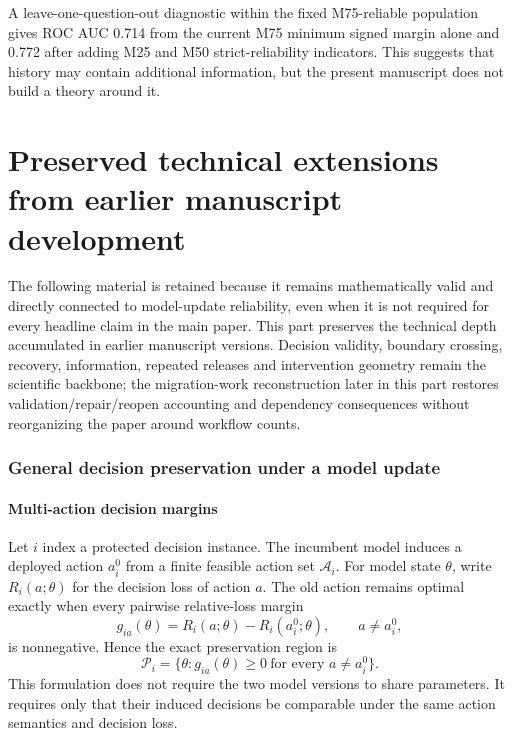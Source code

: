 \documentclass[11pt,letterpaper]{article}
\theoremstyle{plain}
\newcommand{\1}{\mathbf 1}
\begin{document}
A leave-one-question-out diagnostic within the fixed M75-reliable population gives ROC AUC 0.714 from the current M75 minimum signed margin alone and 0.772 after adding M25 and M50 strict-reliability indicators. This suggests that history may contain additional information, but the present manuscript does not build a theory around it.



\part*{Preserved technical extensions from earlier manuscript development}

The following material is retained because it remains mathematically valid and directly connected to model-update reliability, even when it is not required for every headline claim in the main paper. This part preserves the technical depth accumulated in earlier manuscript versions. Decision validity, boundary crossing, recovery, information, repeated releases and intervention geometry remain the scientific backbone; the migration-work reconstruction later in this part restores validation/repair/reopen accounting and dependency consequences without reorganizing the paper around workflow counts.

\section{General decision preservation under a model update}
\subsection{Multi-action decision margins}
Let $i$ index a protected decision instance. The incumbent model induces a deployed action $a_i^0$ from a finite feasible action set $\mathcal A_i$. For model state $\theta$, write $R_i(a;\theta)$ for the decision loss of action $a$. The old action remains optimal exactly when every pairwise relative-loss margin
\begin{equation}
 g_{ia}(\theta)=R_i(a;\theta)-R_i(a_i^0;\theta),\qquad a\neq a_i^0,
\label{eq:s_general_margin}
\end{equation}
is nonnegative. Hence the exact preservation region is
\begin{equation}
 \mathcal P_i=\{\theta:g_{ia}(\theta)\ge 0\ \text{for every }a\neq a_i^0\}.
\label{eq:s_preservation_region}
\end{equation}
This formulation does not require the two model versions to share parameters. It requires only that their induced decisions be comparable under the same action semantics and decision loss.
\end{document}
